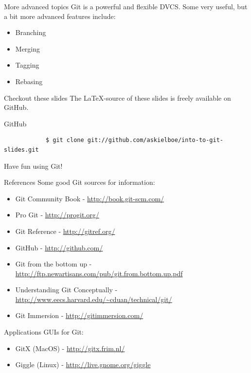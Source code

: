 \documentclass{beamer}
\begin{document}
\begin{frame}[fragile]{More advanced topics}
	Git is a powerful and flexible DVCS. Some very useful, but a bit more advanced features include:
	\begin{itemize}
		\item Branching
		\item Merging
		\item Tagging
		\item Rebasing
	\end{itemize}
\end{frame}

\begin{frame}[fragile]{Checkout these slides}
	The \LaTeX-source of these slides is freely available on GitHub.
	\begin{exampleblock}{GitHub}
		\begin{footnotesize} \begin{verbatim}
			$ git clone git://github.com/askielboe/into-to-git-slides.git
		\end{verbatim} \end{footnotesize}
	\end{exampleblock}
	\vskip45pt
	\begin{center}
		Have fun using Git!
	\end{center}
\end{frame}

\begin{frame}[fragile]{References}
	Some good Git sources for information:
	\begin{itemize}
		\item Git Community Book - \url{http://book.git-scm.com/}
		\item Pro Git - \url{http://progit.org/}	
		\item Git Reference - \url{http://gitref.org/}
		\item GitHub - \url{http://github.com/}
		\item Git from the bottom up - \url{http://ftp.newartisans.com/pub/git.from.bottom.up.pdf}
		\item Understanding Git Conceptually - \url{http://www.eecs.harvard.edu/~cduan/technical/git/}
		\item Git Immersion - \url{http://gitimmersion.com/}
	\end{itemize}
\end{frame}

\begin{frame}[fragile]{Applications}
	GUIs for Git:
	\begin{itemize}
		\item GitX (MacOS) - \url{http://gitx.frim.nl/}
		\item Giggle (Linux) - \url{http://live.gnome.org/giggle}
	\end{itemize}
\end{frame}
\end{document}
